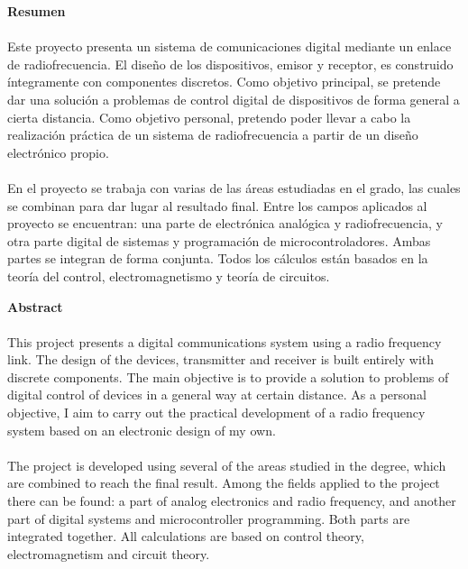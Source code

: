 \documentclass[11pt, a4paper]{article} %
\begin{document}
%    

\newpage



{\bfseries \large Resumen} %
\paragraph{}
Este proyecto presenta un sistema de comunicaciones digital mediante un enlace de radiofrecuencia.
El diseño de los dispositivos, emisor y receptor, es construido íntegramente con componentes discretos.
Como objetivo principal, se pretende dar una solución a problemas de control digital de dispositivos de forma general a cierta distancia. 
Como objetivo personal, pretendo poder llevar a cabo la realización práctica de un sistema de radiofrecuencia a partir de un diseño electrónico propio. 
\paragraph{}
En el proyecto se trabaja con varias de las \'areas estudiadas en el grado, las cuales se combinan para dar lugar al resultado final. 
Entre los campos aplicados al proyecto se encuentran: una parte de electr\'onica anal\'ogica y radiofrecuencia, y otra parte digital de sistemas y programaci\'on de microcontroladores. Ambas partes se integran de forma conjunta. Todos los c\'alculos est\'an basados en la teoría del control, electromagnetismo y teoría de circuitos.

\vspace{1cm}

{\bfseries \large Abstract} %
\paragraph{}
This project presents a digital communications system using a radio frequency link.
The design of the devices, transmitter and receiver is built entirely with discrete components.
The main objective is to provide a solution to problems of digital control of devices in a general way at certain distance. 
As a personal objective, I aim to carry out the practical development of a radio frequency system based on an electronic design of my own.
\paragraph{}
The project is developed using several of the areas studied in the degree, which are combined to reach the final result. 
Among the fields applied to the project there can be found: a part of analog electronics and radio frequency, and another part of digital systems and microcontroller programming. Both parts are integrated together. All calculations are based on control theory, electromagnetism and circuit theory.
\vspace{1cm}
\end{document}
